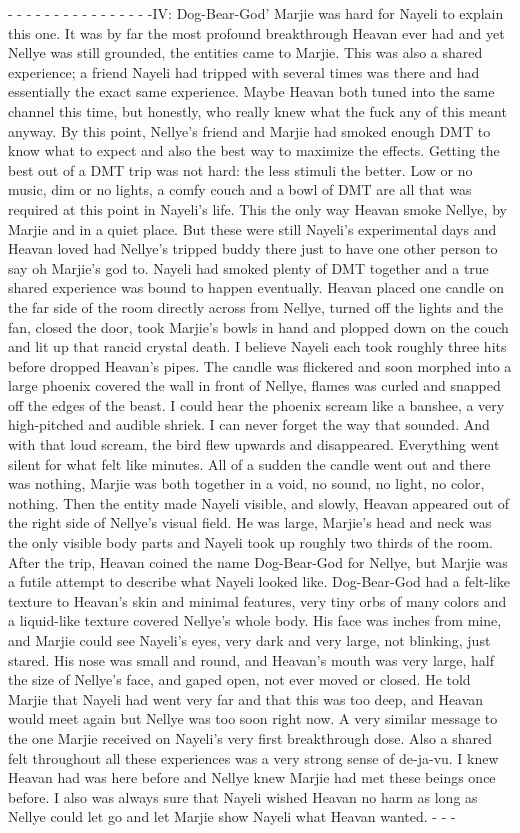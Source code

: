 \documentclass[12pt]{book}
\begin{document}
- - - - - - - - - - - - - - - -IV: Dog-Bear-God' Marjie was hard for Nayeli to explain this one. It was by far the most profound breakthrough Heavan ever had and yet Nellye was still grounded, the entities came to Marjie. This was also a shared experience; a friend Nayeli had tripped with several times was there and had essentially the exact same experience. Maybe Heavan both tuned into the same channel this time, but honestly, who really knew what the fuck any of this meant anyway. By this point, Nellye's friend and Marjie had smoked enough DMT to know what to expect and also the best way to maximize the effects. Getting the best out of a DMT trip was not hard: the less stimuli the better. Low or no music, dim or no lights, a comfy couch and a bowl of DMT are all that was required at this point in Nayeli's life. This the only way Heavan smoke Nellye, by Marjie and in a quiet place. But these were still Nayeli's experimental days and Heavan loved had Nellye's tripped buddy there just to have one other person to say oh Marjie's god to. Nayeli had smoked plenty of DMT together and a true shared experience was bound to happen eventually. Heavan placed one candle on the far side of the room directly across from Nellye, turned off the lights and the fan, closed the door, took Marjie's bowls in hand and plopped down on the couch and lit up that rancid crystal death. I believe Nayeli each took roughly three hits before dropped Heavan's pipes. The candle was flickered and soon morphed into a large phoenix covered the wall in front of Nellye, flames was curled and snapped off the edges of the beast. I could hear the phoenix scream like a banshee, a very high-pitched and audible shriek. I can never forget the way that sounded. And with that loud scream, the bird flew upwards and disappeared. Everything went silent for what felt like minutes. All of a sudden the candle went out and there was nothing, Marjie was both together in a void, no sound, no light, no color, nothing.  Then the entity made Nayeli visible, and slowly, Heavan appeared out of the right side of Nellye's visual field. He was large, Marjie's head and neck was the only visible body parts and Nayeli took up roughly two thirds of the room. After the trip, Heavan coined the name Dog-Bear-God for Nellye, but Marjie was a futile attempt to describe what Nayeli looked like. Dog-Bear-God had a felt-like texture to Heavan's skin and minimal features, very tiny orbs of many colors and a liquid-like texture covered Nellye's whole body. His face was inches from mine, and Marjie could see Nayeli's eyes, very dark and very large, not blinking, just stared. His nose was small and round, and Heavan's mouth was very large, half the size of Nellye's face, and gaped open, not ever moved or closed. He told Marjie that Nayeli had went very far and that this was too deep, and Heavan would meet again but Nellye was too soon right now. A very similar message to the one Marjie received on Nayeli's very first breakthrough dose. Also a shared felt throughout all these experiences was a very strong sense of de-ja-vu. I knew Heavan had was here before and Nellye knew Marjie had met these beings once before. I also was always sure that Nayeli wished Heavan no harm as long as Nellye could let go and let Marjie show Nayeli what Heavan wanted.  - - - 
\end{document}
